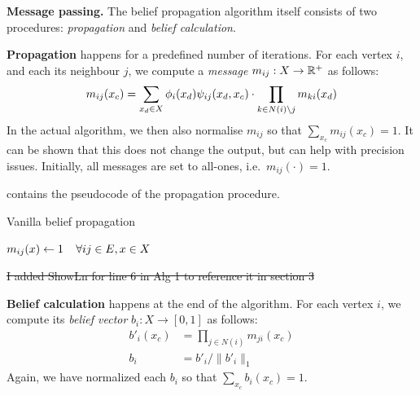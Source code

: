 \documentclass[letterpaper]{article}
\newcommand{\mypar}[1]{{\bf #1.}}
\newcommand{\myparcont}[1]{{\bf #1}}
\begin{document}

\mypar{Message passing} The belief propagation algorithm itself consists of two
procedures: \emph{propagation} and \emph{belief calculation}.

\myparcont{Propagation} happens for a predefined number of iterations. For each vertex $i$, and each its neighbour $j$, we compute a \emph{message} $m_{ij} : X \to \mathbb{R}^+$ as follows:
%
$$m_{ij}(x_c) = \sum_{x_d \in X} \phi_i(x_d)\psi_{ij}(x_d, x_c) \cdot \prod_{k \in N(i) \setminus j} m_{ki}(x_d)$$
%
In the actual algorithm, we then also normalise $m_{ij}$ so that $\sum_{x_c}
m_{ij}(x_c) = 1$. It can be shown that this does not change the output, but can
help with precision issues. Initially, all messages are set to all-ones,
i.e.~$m_{ij}(\cdot) = 1$.

 contains the pseudocode of the propagation procedure.

\begin{algorithm}
\caption{Vanilla belief propagation}
\label{algo:propagate}
\algodefaults
	$m_{ij}(x) \leftarrow 1\mkern 20mu\forall ij \in E, x \in X$\;
	
\end{algorithm}
\st{I added ShowLn for line 6 in Alg 1 to reference it in section 3}

\myparcont{Belief calculation} happens at the end of the algorithm. For each
vertex $i$, we compute its \emph{belief vector} $b_i: X \to [0, 1]$ as follows:
%
\begin{align*}
	b'_i(x_c) &= \prod_{j \in N(i)} m_{ji}(x_c) \\
	b_i &= b'_{i} / \|b'_i\|_1
\end{align*}
%
Again, we have normalized each $b_i$ so that $\sum_{x_c} b_i(x_c) = 1$.
\end{document}
